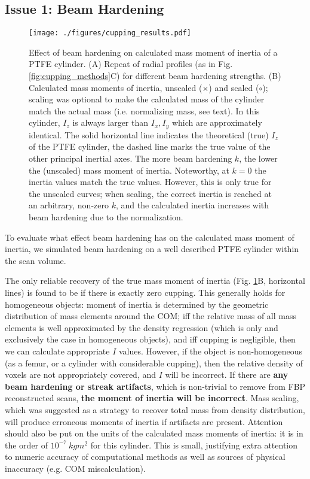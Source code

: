 \subsection{Issue 1: Beam Hardening}
\label{sec:org0338591}

\begin{figure}[p]
\centering
\texttt{[image: ./figures/cupping\_results.pdf]}
\caption{\label{fig:cupping_results}Effect of beam hardening on calculated mass moment of inertia of a PTFE cylinder. (A) Repeat of radial profiles (as in Fig. \ref{fig:cupping_methods}C) for different beam hardening strengths. (B) Calculated mass moments of inertia, unscaled (\(\times\)) and scaled (\(\circ\)); scaling was optional to make the calculated mass of the cylinder match the actual mass (i.e. normalizing mass, see text). In this cylinder, \(I_z\) is always larger than \(I_x, I_y\) which are approximately identical. The solid horizontal line indicates the theoretical (true) \(I_z\) of the PTFE cylinder, the dashed line marks the true value of the other principal inertial axes. The more beam hardening \(k\), the lower the (unscaled) mass moment of inertia. Noteworthy, at \(k=0\) the inertia values match the true values. However, this is only true for the unscaled curves; when scaling, the correct inertia is reached at an arbitrary, non-zero \(k\), and the calculated inertia increases with beam hardening due to the normalization.}
\end{figure}

To evaluate what effect beam hardening has on the calculated mass moment of inertia, we simulated beam hardening on a well described PTFE cylinder within the scan volume.

The only reliable recovery of the true mass moment of inertia (Fig. \ref{fig:cupping_results}B, horizontal lines) is found to be if there is exactly zero cupping.
This generally holds for homogeneous objects: moment of inertia is determined by the geometric distribution of mass elements around the COM; iff the relative mass of all mass elements is well approximated by the density regression (which is only and exclusively the case in homogeneous objects), and iff cupping is negligible, then we can calculate appropriate \(I\) values.
However, if the object is non-homogeneous (as a femur, or a cylinder with considerable cupping), then the relative density of voxels are not appropriately covered, and \(I\) will be incorrect.
If there are \textbf{any beam hardening or streak artifacts}, which is non-trivial to remove from FBP reconstructed scans, \textbf{the moment of inertia will be incorrect}.
Mass scaling, which was suggested as a strategy to recover total mass from density distribution, will produce erroneous moments of inertia if artifacts are present.
Attention should also be put on the units of the calculated mass moments of inertia: it is in the order of \(10^{-7}\ kg m^2\) for this cylinder.
This is small, justifying extra attention to numeric accuracy of computational methods as well as sources of physical inaccuracy (e.g. COM miscalculation).


